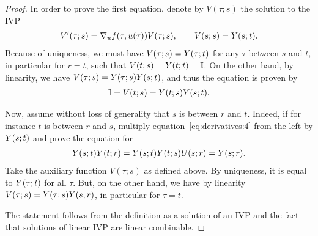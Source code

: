 

\begin{proof}
  In order to prove the first equation, denote by $V(\tau;s)$ the
  solution to the IVP
  \begin{gather*}
    V'(\tau;s) = \nabla_u f(\tau,u(\tau)) V(\tau;s),
    \qquad V(s;s) = \fundamental(s;t).
  \end{gather*}
  Because of uniqueness, we must have
  $V(\tau;s) = \fundamental(\tau;t)$ for any $\tau$ between $s$ and
  $t$, in particular for $r=t$, such that $V(t;s) = \fundamental(t;t) = \identity$. On the
  other hand, by linearity, we have
  $V(\tau;s) = \fundamental(\tau;s)\fundamental(s;t)$, and thus the
  equation is proven by
  \begin{gather*}
    \identity = V(t;s) = \fundamental(t;s)\fundamental(s;t).
  \end{gather*}

  Now, assume without loss of generality that $s$ is between $r$ and
  $t$. Indeed, if for instance $t$ is between $r$ and $s$, multiply
  equation~\eqref{eq:derivatives:4} from the left by $\fundamental(s;t)$ and
  prove the equation for
  \begin{gather*}
    \fundamental(s;t)\fundamental(t;r)
    = \fundamental(s;t)\fundamental(t;s)U(s;r)
    = \fundamental(s;r).
  \end{gather*}
  Take the auxiliary function $V(\tau;s)$ as defined above. By
  uniqueness, it is equal to $\fundamental(\tau;t)$ for all $\tau$. But, on the
  other hand, we have by linearity $V(\tau;s) = \fundamental(\tau;s)\fundamental(s;r)$, in
  particular for $\tau=t$.

  The statement follows from the definition as a solution of an IVP
  and the fact that solutions of linear IVP are linear combinable.
\end{proof}



